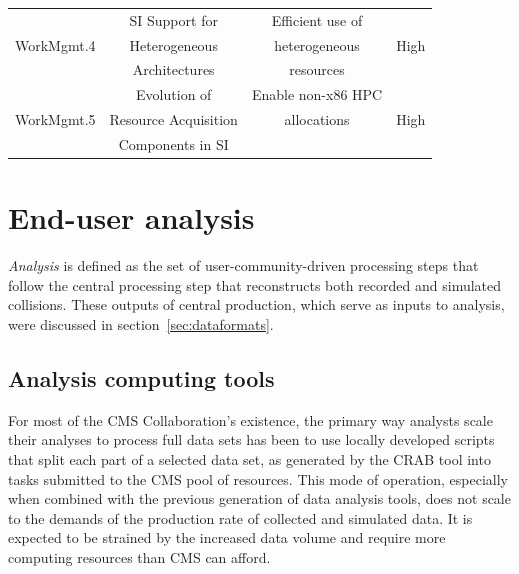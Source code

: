 \begin{table}[tbph]
\begin{tabular}{|c|c|c|c|}
    \cellcolor{tablerowheader}
           &  SI Support for          &  Efficient use of         &                 \\
    \cellcolor{tablerowheader}
WorkMgmt.4 &  Heterogeneous           &  heterogeneous            &    High        \\
    \cellcolor{tablerowheader}
           &  Architectures           &  resources                &                 \\ \hline
    \cellcolor{tablerowheader}
           &  Evolution of            &  Enable non-x86 HPC       &                 \\
    \cellcolor{tablerowheader}
WorkMgmt.5 &  Resource Acquisition    &  allocations              &    High          \\
    \cellcolor{tablerowheader}
           &  Components in SI        &                           &                 \\ \hline
    \end{tabular}
    \label{tab:wmsi-improvements}
\end{table}

\clearpage

%
%
% 
\section{End-user analysis}
\label{sec:Analysis}

{\it Analysis} is defined as the set of user-community-driven processing steps that follow the central processing step that reconstructs both recorded and simulated collisions. These outputs of central production, which serve as inputs to analysis, were discussed in section~\ref{sec:dataformats}.

\subsection{Analysis computing tools}

For most of the CMS Collaboration’s existence, the primary way analysts scale their analyses to process full data sets has been to use locally developed scripts that split each part of a selected data set, as generated by the CRAB tool
into tasks submitted to the CMS pool of resources.
This mode of operation, especially when combined with the previous generation of data analysis tools, does not scale to the demands of the \PhaseTwo production rate of collected and simulated data. It is expected to be strained by the increased data volume and require more computing resources than CMS can afford. 

